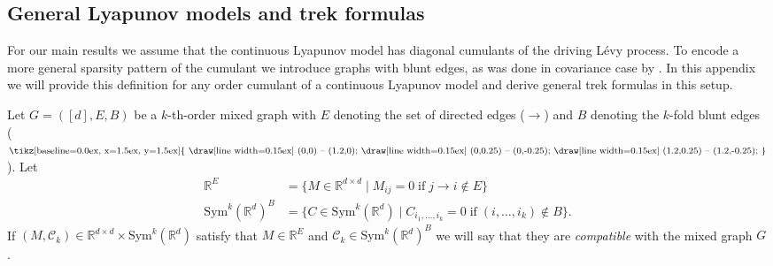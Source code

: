\documentclass{biometrika}
\DeclareRobustCommand{\unEdge}{%
  \mathrel{%
    \vcenter{%
      \hbox{%
        \tikz[baseline=0.0ex, x=1.5ex, y=1.5ex]{
          \draw[line width=0.15ex] (0,0) -- (1.2,0);
          \draw[line width=0.15ex] (0,0.25) -- (0,-0.25);
          \draw[line width=0.15ex] (1.2,0.25) -- (1.2,-0.25);
        }%
      }%
    }%
  }%
}
\begin{document}
\subsection{General Lyapunov models and trek formulas}
\label{Appendix::treks} 
For our main results we assume that the continuous Lyapunov model has diagonal cumulants 
of the driving Lévy process. To encode a more general sparsity pattern of the cumulant we 
introduce graphs with blunt edges, as was done in covariance case by \cite{varando20a}. In 
this appendix we will provide this definition for any order cumulant of a continuous 
Lyapunov model and derive general trek formulas in this setup. 

\begin{definition}
\label{def::Compatiblewithgraph}
Let $G = ([d], E,B)$ be a $k$-th-order mixed graph with $E$ denoting the set of directed edges ($\rightarrow$) and $B$  denoting the $k$-fold blunt edges ($\unEdge$). Let 
\begin{align*}
     \mathbb{R}^{E} &= \{ M \in \mathbb{R}^{d \times d} \; | \; M_{ij} = 0 \; \mathrm{ if } \; j \rightarrow i \not \in E \} \\
     \mathrm{Sym}^k(\mathbb{R}^d)^B &= \{ C \in \mathrm{Sym}^k(\mathbb{R}^d) \; | \; C_{i_1, \dots, i_k} = 0 \; \mathrm{ if } \; (i, \dots, i_k) \not \in B \}.
\end{align*}
If $(M, \mathcal{C}_k) \in \mathbb{R}^{d \times d} \times \mathrm{Sym}^k(\mathbb{R}^d)$ satisfy that $M \in \mathbb{R}^{E}$ and $\mathcal{C}_k \in \mathrm{Sym}^k(\mathbb{R}^d)^B$ we will say that they are \textit{compatible} with the mixed graph $G$. 
\end{definition}
\end{document}
